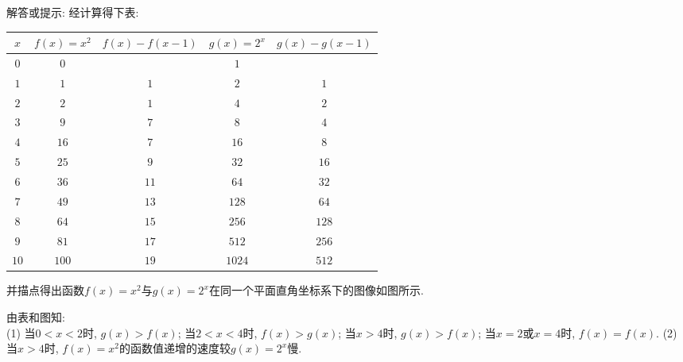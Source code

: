 \documentclass[10pt,a4paper]{article}
\begin{document}
\begin{enumerate}[1.]
解答或提示: 经计算得下表:
\begin{center}
    \begin{tabular}{|c|c|c|c|c|}
        \hline
        $x$	 & $f(x)=x^2$ & $f(x)-f(x-1)$ & $g(x)=2^x$ & $g(x)-g(x-1)$ \\ \hline
        $0$ & $0$ &  & $1$ & \\ \hline 
        $1$ & $1$ & $1$ & $2$ & $1$ \\  \hline 
        $2$ & $2$ & $1$ & $4$ & $2$\\  \hline 
        $3$ & $9$ & $7$ & $8$ & $4$\\  \hline 
        $4$ & $16$ & $7$ & $16$ & $8$\\  \hline 
        $5$ & $25$ & $9$ & $32$ & $16$\\ \hline 
        $6$ & $36$ & $11$ & $64$ & $32$\\  \hline 
        $7$ & $49$ & $13$ & $128$ & $64$\\ \hline
        $8$ & $64$ & $15$ & $256$ & $128$\\  \hline 
        $9$ & $81$ & $17$ & $512$ & $256$\\  \hline 
        $10$ & $100$ & $19$ & $1024$ & $512$\\ \hline
    \end{tabular}
\end{center}
并描点得出函数$f(x)=x^2$与$g(x)=2^x$在同一个平面直角坐标系下的图像如图所示.
\begin{center}
\end{center}
由表和图知:\\
(1) 当$0<x<2$时, $g(x)>f(x)$; 当$2<x<4$时, $f(x)>g(x)$; 当$x>4$时, $g(x)>f(x)$; 当$x=2$或$x=4$时, $f(x)=f(x)$.
(2) 当$x>4$时, $f(x)=x^2$的函数值递增的速度较$g(x)=2^x$慢.


\end{enumerate}
\end{document}
